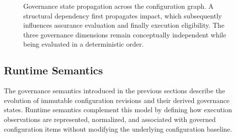 \documentclass[10pt]{article}
\begin{document}
\begin{figure}[t]

\caption{Governance state propagation across the configuration graph.
A structural dependency first propagates impact, which subsequently influences
assurance evaluation and finally execution eligibility. The three governance
dimensions remain conceptually independent while being evaluated in a
deterministic order.}
\label{fig:governance_propagation}
\end{figure}

\subsection{Runtime Semantics}
\label{subsec:runtime_semantics}

The governance semantics introduced in the previous sections describe the
evolution of immutable configuration revisions and their derived governance
states. Runtime semantics complement this model by defining how execution
observations are represented, normalized, and associated with governed
configuration items without modifying the underlying configuration baseline.
\end{document}
